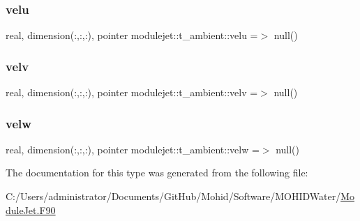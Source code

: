 \subsubsection{\texorpdfstring{velu}{velu}}
{\footnotesize\ttfamily real, dimension(\+:,\+:,\+:), pointer modulejet\+::t\+\_\+ambient\+::velu =$>$ null()\hspace{0.3cm}{\ttfamily [private]}}

\mbox{\label{structmodulejet_1_1t__ambient_ac17b50c68f122b0a0c84bfe23d1abdf2}} 
\subsubsection{\texorpdfstring{velv}{velv}}
{\footnotesize\ttfamily real, dimension(\+:,\+:,\+:), pointer modulejet\+::t\+\_\+ambient\+::velv =$>$ null()\hspace{0.3cm}{\ttfamily [private]}}

\mbox{\label{structmodulejet_1_1t__ambient_a8c17594839b6136e972e81712abc3b71}} 
\subsubsection{\texorpdfstring{velw}{velw}}
{\footnotesize\ttfamily real, dimension(\+:,\+:,\+:), pointer modulejet\+::t\+\_\+ambient\+::velw =$>$ null()\hspace{0.3cm}{\ttfamily [private]}}



The documentation for this type was generated from the following file\+:\begin{DoxyCompactItemize}
\item 
C\+:/\+Users/administrator/\+Documents/\+Git\+Hub/\+Mohid/\+Software/\+M\+O\+H\+I\+D\+Water/\mbox{\hyperlink{_module_jet_8_f90}{Module\+Jet.\+F90}}\end{DoxyCompactItemize}
